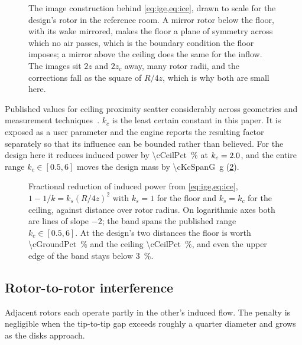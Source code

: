 \begin{figure}[tbp]
\centering

\caption{The image construction behind \cref{eq:ige,eq:ice}, drawn to scale for
the design's rotor in the reference room. A mirror rotor below the floor, with
its wake mirrored, makes the floor a plane of symmetry across which no air
passes, which is the boundary condition the floor imposes; a mirror above the
ceiling does the same for the inflow. The images sit $2z$ and $2z_c$ away, many
rotor radii, and the corrections fall as the square of $R/4z$, which is why both
are small here.}
\label{fig:image}
\end{figure}

\begin{remark}
Published values for ceiling proximity scatter considerably across geometries
and measurement techniques~\cite{sanchezcuevas2017,conyers2019}. $k_c$ is the
least certain constant in this paper. It is exposed as a user parameter and
the engine reports the resulting factor separately so that its influence can be
bounded rather than believed. For the design here it reduces induced power by
\SI{\cCeilPct}{\percent} at $k_c=2.0$, and the entire range $k_c\in[0.5,6]$
moves the design mass by \SI{\cKcSpanG}{\gram} (\cref{fig:surface}).
\end{remark}

\begin{figure}[tbp]
\centering

\caption{Fractional reduction of induced power from \cref{eq:ige,eq:ice},
$1-1/k=k_s(R/4z)^2$ with $k_s=1$ for the floor and $k_s=k_c$ for the ceiling,
against distance over rotor radius. On logarithmic axes both are lines of slope
$-2$; the band spans the published range $k_c\in[0.5,6]$. At the design's two
distances the floor is worth \SI{\cGroundPct}{\percent} and the ceiling
\SI{\cCeilPct}{\percent}, and even the upper edge of the band stays below
\SI{3}{\percent}.}
\label{fig:surface}
\end{figure}

\subsection{Rotor-to-rotor interference}

Adjacent rotors each operate partly in the other's induced flow. The penalty is
negligible when the tip-to-tip gap exceeds roughly a quarter diameter and grows
as the disks approach.

